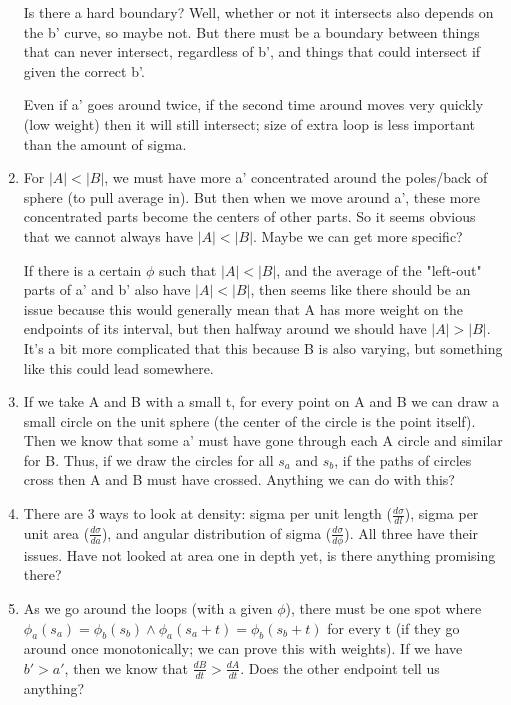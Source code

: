 \documentclass[12pt]{article}
\begin{document}
\begin{enumerate}
Is there a hard boundary? Well, whether or not it intersects also depends on the b' curve, so maybe not. But there must be a boundary between things that can never intersect, regardless of b', and things that could intersect if given the correct b'.

Even if a' goes around twice, if the second time around moves very quickly (low weight) then it will still intersect; size of extra loop is less important than the amount of sigma.

\item For $|A| < |B|$, we must have more a' concentrated around the poles/back of sphere (to pull average in). But then when we move around a', these more concentrated parts become the centers of other parts. So it seems obvious that we cannot always have $|A| < |B|$. Maybe we can get more specific?

If there is a certain $\phi$ such that $|A| < |B|$, and the average of the "left-out" parts of a' and b' also have $|A| < |B|$, then seems like there should be an issue because this would generally mean that A has more weight on the endpoints of its interval, but then halfway around we should have $|A| > |B|$. It's a bit more complicated that this because B is also varying, but something like this could lead somewhere.

\item If we take A and B with a small t, for every point on A and B we can draw a small circle on the unit sphere (the center of the circle is the point itself). Then we know that some a' must have gone through each A circle and similar for B. Thus, if we draw the circles for all $s_a$ and $s_b$, if the paths of circles cross then A and B must have crossed. Anything we can do with this?

\item There are 3 ways to look at density: sigma per unit length ($\frac{d\sigma}{dl}$), sigma per unit area ($\frac{d\sigma}{da}$), and angular distribution of sigma ($\frac{d\sigma}{d\phi}$). All three have their issues. Have not looked at area one in depth yet, is there anything promising there?

\item As we go around the loops (with a given $\phi$), there must be one spot where $\phi_a(s_a) = \phi_b(s_b) \wedge \phi_a(s_a + t) = \phi_b(s_b + t)$ for every t (if they go around once monotonically; we can prove this with weights). If we have $b' > a'$, then we know that $\frac{dB}{dt} > \frac{dA}{dt}$. Does the other endpoint tell us anything?


\end{enumerate}
\end{document}
